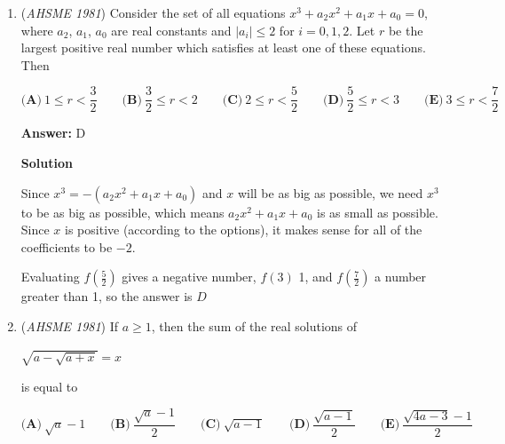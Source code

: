 \begin{enumerate}
 Let $x = AF = FE = FG$.  By the Law of Cosines, $AE^2 = x^2 + x^2 - 2x \cdot x \cdot \cos(120^\circ) = 3x^2$, so $AE = x\sqrt{3}$.  $\stackrel{\frown}{AG}\ =\ \stackrel{\frown}{DC}$, $AG = DC$.  Thus $\triangle DEC \cong \triangle AEG$, and $EC = 2x$.  Thus $AC = AB = x(2+\sqrt{3})$.  The area of $\triangle AFE$ is $\frac{1}{2} \cdot x \cdot x\sqrt{3} \cdot \sin 30^\circ = \frac{x^2\sqrt{3}}{4}$, while the area of $\triangle ABC$ is $\frac{1}{2} \cdot x(2+\sqrt{3}) \cdot x(2+\sqrt{3}) \cdot \sin 30^\circ = \frac{x^2(7+4\sqrt{3})}{4}$.  

 The ratio of these two areas is $\frac{\frac{x^2\sqrt{3}}{4}}{\frac{x^2(7+4\sqrt{3})}{4}} = \frac{\sqrt{3}}{7+4\sqrt{3}} = \sqrt{3}(7-4\sqrt{3}) = 7\sqrt{3} - 12$ $\fbox{(D)}$.

 -j314andrews

 


	\item (\textit{AHSME 1981}) Consider the set of all equations $x^3 + a_2x^2 + a_1x + a_0 = 0$, where $a_2$, $a_1$, $a_0$ are real constants and $|a_i| \leq 2$ for $i = 0,1,2$. Let $r$ be the largest positive real number which satisfies at least one of these equations. Then


 $\textbf{(A)}\ 1 \leq r < \dfrac{3}{2}\qquad \textbf{(B)}\ \dfrac{3}{2} \leq r < 2\qquad \textbf{(C)}\ 2 \leq r < \dfrac{5}{2}\qquad \textbf{(D)}\ \dfrac{5}{2} \leq r < 3\qquad \textbf{(E)}\ 3 \leq r < \dfrac{7}{2}$

 \textbf{Answer: }D



\textbf{Solution}

Since $x^3 = -(a_2x^2 + a_1x + a_0)$ and $x$ will be as big as possible, we need $x^3$ to be as big as possible, which means $a_2x^2 + a_1x + a_0$ is as small as possible. Since $x$ is positive (according to the options), it makes sense for all of the coefficients to be $-2$.

 Evaluating $f(\frac{5}{2})$ gives a negative number, $f(3)$ 1, and $f(\frac{7}{2})$ a number greater than 1, so the answer is $\boxed{D}$



	\item (\textit{AHSME 1981}) If $a \geq 1$, then the sum of the real solutions of 


 $\sqrt{a - \sqrt{a + x}} = x$


 is equal to 


 $\textbf{(A)}\ \sqrt{a} - 1\qquad \textbf{(B)}\ \dfrac{\sqrt{a}- 1}{2}\qquad \textbf{(C)}\ \sqrt{a - 1}\qquad \textbf{(D)}\ \dfrac{\sqrt{a - 1}}{2}\qquad \textbf{(E)}\ \dfrac{\sqrt{4a- 3} - 1}{2}$


\end{enumerate}
